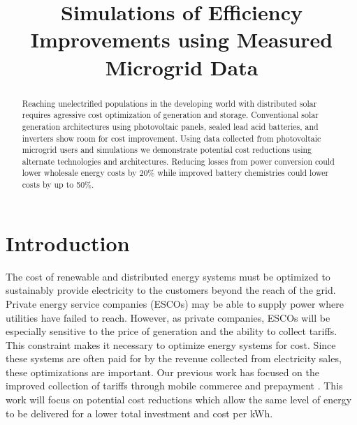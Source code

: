 \documentclass[conference]{IEEEtran}
\title{Simulations of Efficiency Improvements using Measured Microgrid Data}
\begin{document}
\author{
\and
{}
}

\maketitle

\begin{abstract}
Reaching unelectrified populations in the developing world
with distributed solar requires agressive cost optimization of
generation and storage.
Conventional solar generation architectures using photovoltaic
panels, sealed lead acid batteries, and inverters show room for
cost improvement.
Using data collected from photovoltaic microgrid users and simulations
we demonstrate potential cost reductions using alternate
technologies and architectures.
Reducing losses from power conversion could lower wholesale energy
costs by 20\% while improved battery chemistries could lower
costs by up to 50\%.
\end{abstract}

\section{Introduction}

The cost of renewable and distributed energy systems must be
optimized to sustainably provide electricity to the customers
beyond the reach of the grid.
Private energy service companies (ESCOs) may be able to supply power
where utilities have failed to reach.
However, as private companies, ESCOs will be especially sensitive
to the price of generation and the ability to collect
tariffs.
This constraint makes it necessary to optimize energy systems
for cost.
Since these systems are often paid for by the revenue collected
from electricity sales, these optimizations are important.
\cite{Lemaire-2011}
Our previous work has focused on the improved collection of
tariffs through mobile commerce and prepayment \cite{ICTD}.
This work will focus on potential cost reductions which allow
the same level of energy to be delivered for a lower total
investment and cost per kWh.
\end{document}
